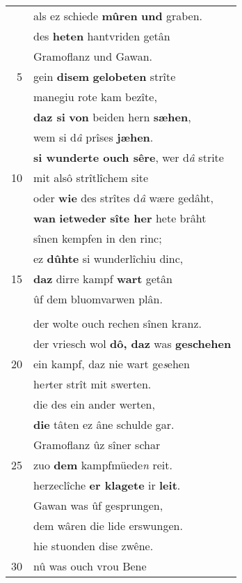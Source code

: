 \documentclass[8pt,a4paper,notitlepage]{article}
\begin{document}
\begin{table}[ht]
\begin{minipage}[t]{0.5\linewidth}
\begin{tabular}{rl}
 & als ez schiede \textbf{mûren} \textbf{und} graben.\\ 
 & des \textbf{heten} hantvriden getân\\ 
 & Gramoflanz und Gawan.\\ 
5 & gein \textbf{disem} \textbf{gelobeten} strîte\\ 
 & manegiu rote kam bezîte,\\ 
 & \textbf{daz si} \textbf{von} beiden hern \textbf{sæhen},\\ 
 & wem si d\textit{â} prîses \textbf{jæhen}.\\ 
 & \textbf{si wunderte ouch sêre}, wer d\textit{â} strite\\ 
10 & mit alsô strîtlîchem site\\ 
 & oder \textbf{wie} des strîtes d\textit{â} wære gedâht,\\ 
 & \textbf{wan} \textbf{ietweder} \textbf{sîte her} hete brâht\\ 
 & sînen kempfen in den rinc;\\ 
 & ez \textbf{dûhte} si wunderlîchiu dinc,\\ 
15 & \textbf{daz} dirre kampf \textbf{wart} getân\\ 
 & ûf dem bluomvarwen plân.\\ 
 & \textbf{\begin{large}D\end{large}ô} kam der künec Gramoflanz;\\ 
 & der wolte ouch rechen sînen kranz.\\ 
 & der vriesch wol \textbf{dô, daz} was \textbf{geschehen}\\ 
20 & ein kampf, daz nie wart ge\textit{s}ehen\\ 
 & he\textit{r}ter strît mit swerten.\\ 
 & die des ein ander werten,\\ 
 & \textbf{die} tâten ez âne schulde gar.\\ 
 & Gramoflanz ûz sîner schar\\ 
25 & zuo \textbf{dem} kampfmüede\textit{n} reit.\\ 
 & herzeclîche \textbf{er klagete} ir \textbf{leit}.\\ 
 & Gawan was ûf gesprungen,\\ 
 & dem wâren die lide erswungen.\\ 
 & hie stuonden dise zwêne.\\ 
30 & nû was ouch vrou Bene\\ 
\end{tabular}

\end{minipage}
\end{table}
\end{document}
